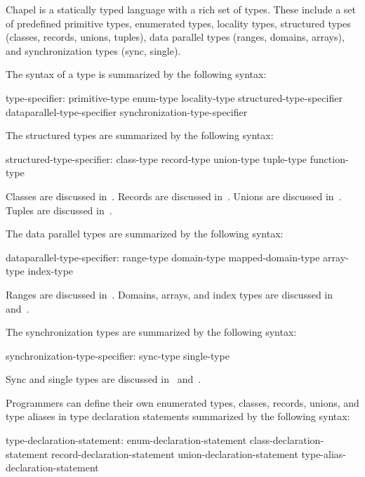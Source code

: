 \label{Types}

Chapel is a statically typed language with a rich set of types.  These
include a set of predefined primitive types, enumerated types,
locality types, structured types (classes, records, unions, tuples),
data parallel types (ranges, domains, arrays), and synchronization
types (sync, single).


The syntax of a type is summarized by the following syntax:

\begin{syntax}
type-specifier:
  primitive-type
  enum-type
  locality-type
  structured-type-specifier
  dataparallel-type-specifier
  synchronization-type-specifier
\end{syntax}

The structured types are summarized by the following syntax:

\begin{syntax}
structured-type-specifier:
  class-type
  record-type
  union-type
  tuple-type
  function-type
\end{syntax}

Classes are discussed in~.  Records are discussed
in~.  Unions are discussed in~.  Tuples are
discussed in~.  

The data parallel types are summarized by the following syntax:

\begin{syntax}
dataparallel-type-specifier:
  range-type
  domain-type
  mapped-domain-type
  array-type
  index-type
\end{syntax}

Ranges are discussed in~.  Domains, arrays, and index
types are discussed in~ and~.

The synchronization types are summarized by the following syntax:

\begin{syntax}
synchronization-type-specifier:
  sync-type
  single-type
\end{syntax}

Sync and single types are discussed in~
and~.

Programmers can define their own enumerated types, classes, records,
unions, and type aliases in type declaration statements summarized by
the following syntax:
\begin{syntax}
type-declaration-statement:
  enum-declaration-statement
  class-declaration-statement
  record-declaration-statement
  union-declaration-statement
  type-alias-declaration-statement
\end{syntax}

